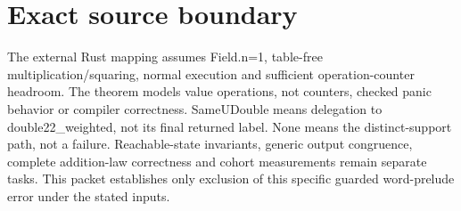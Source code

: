 \documentclass[10pt]{article}
\begin{document}
\section*{Exact source boundary}
The external Rust mapping assumes Field.n=1, table-free multiplication/squaring, normal execution and sufficient operation-counter headroom. The theorem models value operations, not counters, checked panic behavior or compiler correctness. SameUDouble means delegation to double22\_weighted, not its final returned label. None means the distinct-support path, not a failure. Reachable-state invariants, generic output congruence, complete addition-law correctness and cohort measurements remain separate tasks. This packet establishes only exclusion of this specific guarded word-prelude error under the stated inputs.
\end{document}
